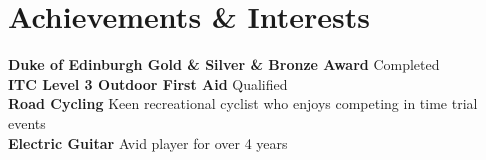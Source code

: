 \documentclass[a4paper,11pt]{article}
\begin{document}
\section{Achievements \& Interests}
  \textbf{Duke of Edinburgh Gold \& Silver \& Bronze Award}{ Completed } \\
  \textbf{ITC Level 3 Outdoor First Aid}{ Qualified}\\
  \textbf{Road Cycling}{ Keen recreational cyclist who enjoys competing in time trial events} \\
  \textbf{Electric Guitar}{ Avid player for over 4 years} \\
  
  
  
\end{document}
